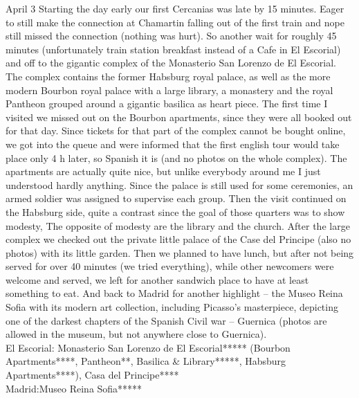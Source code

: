 April 3
Starting the day early our first Cercanias was late by 15 minutes. Eager to still make the connection at Chamartin falling out of the first train and nope still missed the connection (nothing was hurt). So another wait for roughly 45 minutes (unfortunately train station breakfast instead of a Cafe in El Escorial) and off to the gigantic complex of the Monasterio San Lorenzo de El Escorial. The complex contains the former Habsburg royal palace, as well as the more modern Bourbon royal palace with a large library, a monastery and the royal Pantheon grouped around a gigantic basilica as heart piece. The first time I visited we missed out on the Bourbon apartments, since they were all booked out for that day. Since tickets for that part of the complex cannot be bought online, we got into the queue and were informed that the first english tour would take place only 4 h later, so Spanish it is (and no photos on the whole complex). The apartments are actually quite nice, but unlike everybody around me I just understood hardly anything. Since the palace is still used for some ceremonies, an armed soldier was assigned to supervise each group. Then the visit continued on the Habsburg side, quite a contrast since the goal of those quarters was to show modesty, The opposite of modesty are the library and the church. After the large complex we checked out the private little palace of the Case del Principe (also no photos) with its little garden. Then we planned to have lunch, but after not being served for over 40 minutes (we tried everything), while other newcomers were welcome and served, we left for another sandwich place to have at least something to eat. And back to Madrid for another highlight -- the Museo Reina Sofia with its modern art collection, including Picasso's masterpiece, depicting one of the darkest chapters of the Spanish Civil war -- Guernica (photos are allowed in the museum, but not anywhere close to Guernica).\\

El Escorial:
Monasterio San Lorenzo de El Escorial***** (Bourbon Apartments****, Pantheon**, Basilica \& Library*****, Habsburg Apartments****),
Casa del Principe****\\
Madrid:Museo Reina Sofia*****\\


